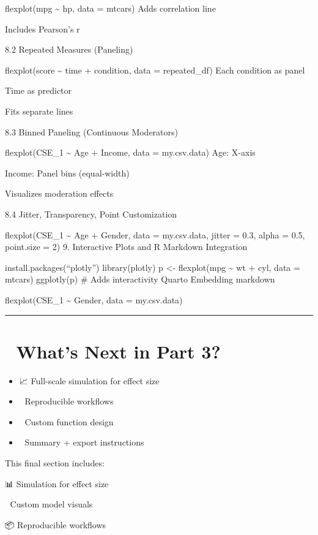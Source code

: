 \documentclass[
  letterpaper,
  DIV=11,
  numbers=noendperiod]{scrreprt}
\providecommand{\tightlist}{%
  \setlength{\itemsep}{0pt}\setlength{\parskip}{0pt}}
\begin{document}
{flexplot(mpg \textasciitilde{} hp, data = mtcars) Adds correlation line

Includes Pearson's r

8.2 Repeated Measures (Paneling)

flexplot(score \textasciitilde{} time + condition, data = repeated\_df)
Each condition as panel

Time as predictor

Fits separate lines

8.3 Binned Paneling (Continuous Moderators)

flexplot(CSE\_1 \textasciitilde{} Age + Income, data = my.csv.data) Age:
X-axis

Income: Panel bins (equal-width)

Visualizes moderation effects

8.4 Jitter, Transparency, Point Customization

flexplot(CSE\_1 \textasciitilde{} Age + Gender, data = my.csv.data,
jitter = 0.3, alpha = 0.5, point.size = 2) 9. Interactive Plots and R
Markdown Integration

install.packages(``plotly'') library(plotly) p \textless- flexplot(mpg
\textasciitilde{} wt + cyl, data = mtcars) ggplotly(p) \# Adds
interactivity Quarto Embedding markdown

flexplot(CSE\_1 \textasciitilde{} Gender, data = my.csv.data)

\begin{center}\rule{0.5\linewidth}{0.5pt}\end{center}

\section{🧠 What's Next in Part 3?}\label{whats-next-in-part-3}

\begin{itemize}
\tightlist
\item
  📈 Full-scale simulation for effect size
\item
  🧪 Reproducible workflows
\item
  🧰 Custom function design
\item
  📘 Summary + export instructions
\end{itemize}

This final section includes:

📊 Simulation for effect size

🧪 Custom model visuals

📦 Reproducible workflows

}
\end{document}
